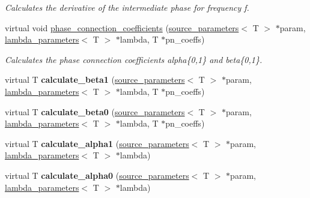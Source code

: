 \begin{DoxyCompactItemize}
\begin{DoxyCompactList}\small\item\em Calculates the derivative of the intermediate phase for frequency f. \end{DoxyCompactList}\item 
virtual void \hyperlink{classIMRPhenomD_a6847c2c48302ff863b9a93354e71afcc}{phase\+\_\+connection\+\_\+coefficients} (\hyperlink{structsource__parameters}{source\+\_\+parameters}$<$ T $>$ $\ast$param, \hyperlink{structlambda__parameters}{lambda\+\_\+parameters}$<$ T $>$ $\ast$lambda, T $\ast$pn\+\_\+coeffs)
\begin{DoxyCompactList}\small\item\em Calculates the phase connection coefficients alpha\{0,1\} and beta\{0,1\}. \end{DoxyCompactList}\item 
\mbox{\label{classIMRPhenomD_a343638375f42abb5097f26ef3fe183ad}} 
virtual T {\bfseries calculate\+\_\+beta1} (\hyperlink{structsource__parameters}{source\+\_\+parameters}$<$ T $>$ $\ast$param, \hyperlink{structlambda__parameters}{lambda\+\_\+parameters}$<$ T $>$ $\ast$lambda, T $\ast$pn\+\_\+coeffs)
\item 
\mbox{\label{classIMRPhenomD_ac3c4886ba5fafea197b2c8be90a04e63}} 
virtual T {\bfseries calculate\+\_\+beta0} (\hyperlink{structsource__parameters}{source\+\_\+parameters}$<$ T $>$ $\ast$param, \hyperlink{structlambda__parameters}{lambda\+\_\+parameters}$<$ T $>$ $\ast$lambda, T $\ast$pn\+\_\+coeffs)
\item 
\mbox{\label{classIMRPhenomD_a5bcd7d9b753b0e6acc9c74618ae484ad}} 
virtual T {\bfseries calculate\+\_\+alpha1} (\hyperlink{structsource__parameters}{source\+\_\+parameters}$<$ T $>$ $\ast$param, \hyperlink{structlambda__parameters}{lambda\+\_\+parameters}$<$ T $>$ $\ast$lambda)
\item 
\mbox{\label{classIMRPhenomD_aa8686f48edea51188f5a9168009ad677}} 
virtual T {\bfseries calculate\+\_\+alpha0} (\hyperlink{structsource__parameters}{source\+\_\+parameters}$<$ T $>$ $\ast$param, \hyperlink{structlambda__parameters}{lambda\+\_\+parameters}$<$ T $>$ $\ast$lambda)
\item 
\mbox{\label{classIMRPhenomD_aa945ea05c7846632798d29c88ae85ac9}} 

\end{DoxyCompactItemize}
